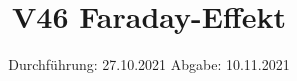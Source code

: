 

\subject{Fortgeschrittenenpraktikum}
\title{V46 Faraday-Effekt}
\date{%
  Durchführung: 27.10.2021
  \hspace{3em}
  Abgabe: 10.11.2021
}



\maketitle
\thispagestyle{empty}
\tableofcontents
\newpage







\printbibliography{}


